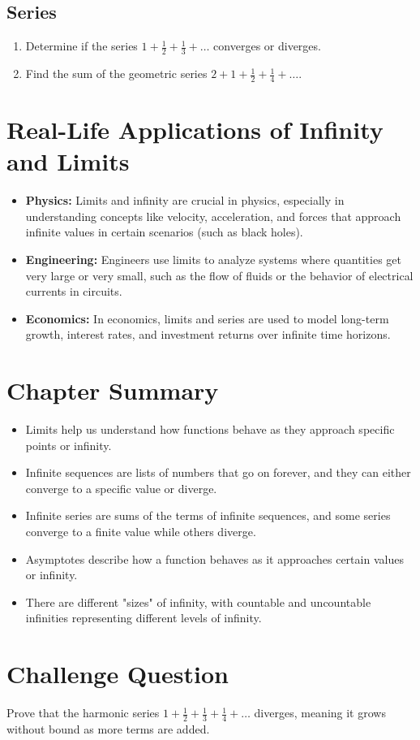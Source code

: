\subsection{Series}
\begin{enumerate}
    \item Determine if the series $1 + \frac{1}{2} + \frac{1}{3} + \dots$ converges or diverges.
    \item Find the sum of the geometric series $2 + 1 + \frac{1}{2} + \frac{1}{4} + \dots$.
\end{enumerate}

\section{Real-Life Applications of Infinity and Limits}
\begin{itemize}
    \item \textbf{Physics:} Limits and infinity are crucial in physics, especially in understanding concepts like velocity, acceleration, and forces that approach infinite values in certain scenarios (such as black holes).
    \item \textbf{Engineering:} Engineers use limits to analyze systems where quantities get very large or very small, such as the flow of fluids or the behavior of electrical currents in circuits.
    \item \textbf{Economics:} In economics, limits and series are used to model long-term growth, interest rates, and investment returns over infinite time horizons.
\end{itemize}

\section{Chapter Summary}
\begin{itemize}
    \item Limits help us understand how functions behave as they approach specific points or infinity.
    \item Infinite sequences are lists of numbers that go on forever, and they can either converge to a specific value or diverge.
    \item Infinite series are sums of the terms of infinite sequences, and some series converge to a finite value while others diverge.
    \item Asymptotes describe how a function behaves as it approaches certain values or infinity.
    \item There are different "sizes" of infinity, with countable and uncountable infinities representing different levels of infinity.
\end{itemize}

\section*{Challenge Question}
Prove that the harmonic series $1 + \frac{1}{2} + \frac{1}{3} + \frac{1}{4} + \dots$ diverges, meaning it grows without bound as more terms are added.